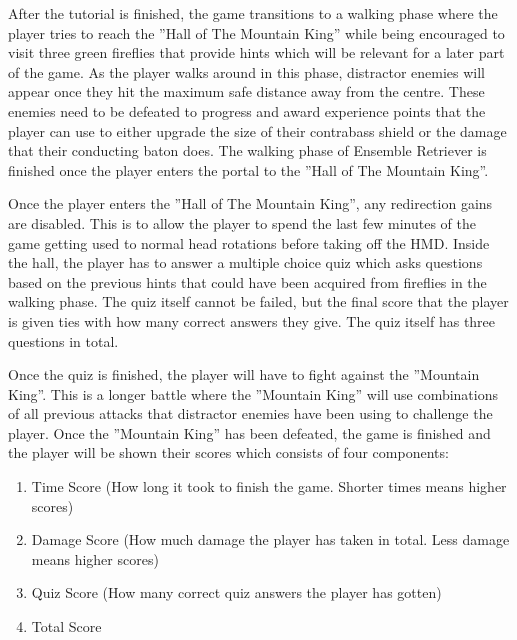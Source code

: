 After the tutorial is finished, the game transitions to a walking phase where the player tries to reach the ''Hall of The Mountain King'' while being encouraged to visit three green fireflies that provide hints which will be relevant for a later part of the game. As the player walks around in this phase, distractor enemies will appear once they hit the maximum safe distance away from the centre. These enemies need to be defeated to progress and award experience points that the player can use to either upgrade the size of their contrabass shield or the damage that their conducting baton does. The walking phase of Ensemble Retriever is finished once the player enters the portal to the ''Hall of The Mountain King''.

Once the player enters the ''Hall of The Mountain King'', any redirection gains are disabled. This is to allow the player to spend the last few minutes of the game getting used to normal head rotations before taking off the HMD. Inside the hall, the player has to answer a multiple choice quiz which asks questions based on the previous hints that could have been acquired from fireflies in the walking phase. The quiz itself cannot be failed, but the final score that the player is given ties with how many correct answers they give. The quiz itself has three questions in total.

Once the quiz is finished, the player will have to fight against the ''Mountain King''. This is a longer battle where the ''Mountain King'' will use combinations of all previous attacks that distractor enemies have been using to challenge the player. Once the ''Mountain King'' has been defeated, the game is finished and the player will be shown their scores which consists of four components:
\begin{enumerate}
    \item Time Score (How long it took to finish the game. Shorter times means higher scores)
    \item Damage Score (How much damage the player has taken in total. Less damage means higher scores)
    \item Quiz Score (How many correct quiz answers the player has gotten)
    \item Total Score
\end{enumerate}

